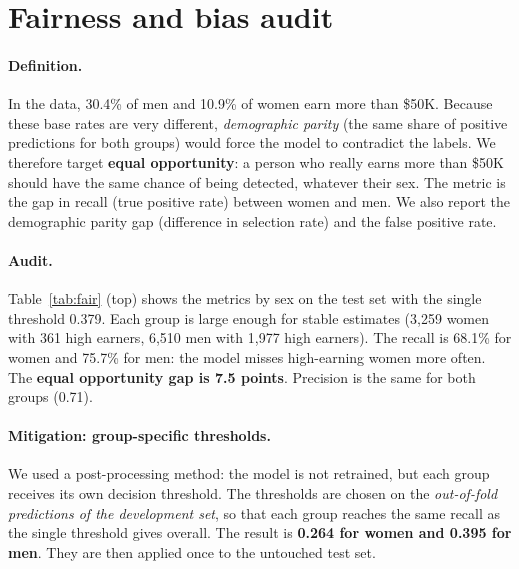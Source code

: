 \documentclass[11pt,a4paper]{article}
\begin{document}
\section{Fairness and bias audit}
\label{sec:fairness}

\paragraph{Definition.}
In the data, 30.4\% of men and 10.9\% of women earn more than \$50K. Because these base rates are very different, \emph{demographic parity} (the same share of positive predictions for both groups) would force the model to contradict the labels.
We therefore target \textbf{equal opportunity}: a person who really earns more than \$50K should have the same chance of being detected, whatever their sex. The metric is the gap in recall (true positive rate) between women and men. We also report the demographic parity gap (difference in selection rate) and the false positive rate.

\paragraph{Audit.}
Table~\ref{tab:fair} (top) shows the metrics by sex on the test set with the single threshold 0.379. Each group is large enough for stable estimates (3{,}259 women with 361 high earners, 6{,}510 men with 1{,}977 high earners).
The recall is 68.1\% for women and 75.7\% for men: the model misses high-earning women more often. The \textbf{equal opportunity gap is 7.5 points}. Precision is the same for both groups (0.71).

\paragraph{Mitigation: group-specific thresholds.}
We used a post-processing method: the model is not retrained, but each group receives its own decision threshold.
The thresholds are chosen on the \emph{out-of-fold predictions of the development set}, so that each group reaches the same recall as the single threshold gives overall. The result is \textbf{0.264 for women and 0.395 for men}. They are then applied once to the untouched test set.
\end{document}

